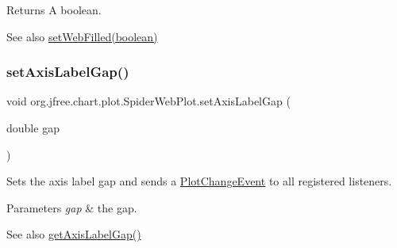 \begin{DoxyReturn}{Returns}
A boolean.
\end{DoxyReturn}
\begin{DoxySeeAlso}{See also}
\mbox{\hyperlink{classorg_1_1jfree_1_1chart_1_1plot_1_1_spider_web_plot_aea33b93e61e56e9feec42809d7138707}{set\+Web\+Filled(boolean)}} 
\end{DoxySeeAlso}
\mbox{\label{classorg_1_1jfree_1_1chart_1_1plot_1_1_spider_web_plot_a3b64f9217fe3d9ecc2ee4f3bed7f2d6b}} 
\subsubsection{\texorpdfstring{set\+Axis\+Label\+Gap()}{setAxisLabelGap()}}
{\footnotesize\ttfamily void org.\+jfree.\+chart.\+plot.\+Spider\+Web\+Plot.\+set\+Axis\+Label\+Gap (\begin{DoxyParamCaption}\item[{double}]{gap }\end{DoxyParamCaption})}

Sets the axis label gap and sends a \mbox{\hyperlink{}{Plot\+Change\+Event}} to all registered listeners.


\begin{DoxyParams}{Parameters}
{\em gap} & the gap.\\
\hline
\end{DoxyParams}
\begin{DoxySeeAlso}{See also}
\mbox{\hyperlink{classorg_1_1jfree_1_1chart_1_1plot_1_1_spider_web_plot_a7b9f148b29a57cb490d788a6b6208e38}{get\+Axis\+Label\+Gap()}} 
\end{DoxySeeAlso}
\mbox{\label{classorg_1_1jfree_1_1chart_1_1plot_1_1_spider_web_plot_a9cb56a1a5989adca77738f49e7d387d9}} 
